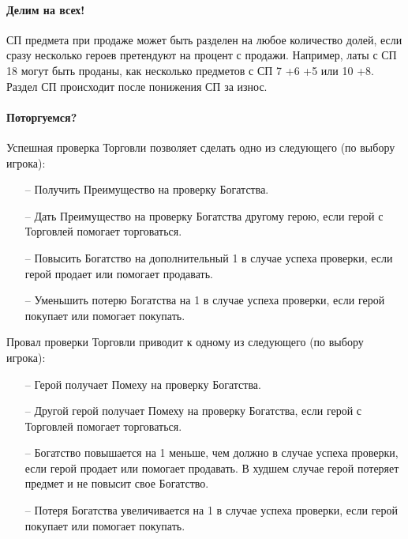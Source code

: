 \paragraph{Делим на всех!} СП предмета при продаже может быть разделен на любое количество долей, если сразу несколько героев претендуют на процент с продажи. Например, латы с СП 18 могут быть проданы, как несколько предметов с СП 7 +6 +5 или 10 +8. Раздел СП происходит после понижения СП за износ.
\paragraph{Поторгуемся?} Успешная проверка Торговли позволяет сделать одно из следующего (по выбору игрока):
\begin{itemize}
\item[--] Получить Преимущество на проверку Богатства.
\item[--] Дать Преимущество на проверку Богатства другому герою, если герой с Торговлей помогает торговаться.
\item[--] Повысить Богатство на дополнительный 1 в случае успеха проверки, если герой продает или помогает продавать.
\item[--] Уменьшить потерю Богатства на 1 в случае успеха проверки, если герой покупает или помогает покупать.
\end{itemize}
Провал проверки Торговли приводит к одному из следующего (по выбору игрока):
\begin{itemize}
\item[--] Герой получает Помеху на проверку Богатства.
\item[--] Другой герой получает Помеху на проверку Богатства, если герой с Торговлей помогает торговаться.
\item[--] Богатство повышается на 1 меньше, чем должно в случае успеха проверки, если герой продает или помогает продавать. В худшем случае герой потеряет предмет и не повысит свое Богатство.
\item[--] Потеря Богатства увеличивается на 1 в случае успеха проверки, если герой покупает или помогает покупать.
\end{itemize}
